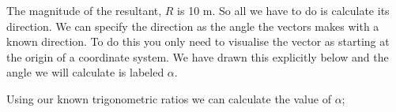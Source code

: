 {\begin{mdframed}[linewidth=4, leftmargin=40, rightmargin=40]
\begin{exercise}
\begin{enumerate}[noitemsep, label=\textbf{Step} \textbf{\arabic*}. ]
        \par 
        \label{m38819*id195854}The magnitude of the resultant, \begin{math}R\end{math} is 10 m. So all we have to do is calculate its direction. We can specify the direction as the angle the vectors makes with a known direction. To do this you only need to visualise the vector as starting at the origin of a coordinate system. We have drawn this explicitly below and the angle we will calculate is labeled \begin{math}\alpha \end{math}.\par 
        \label{m38819*id195877}Using our known trigonometric ratios we can calculate the value of \begin{math}\alpha \end{math};\par 
        \label{m38819*id195891}\nopagebreak\noindent{}
\end{enumerate}
\end{exercise}
\end{mdframed}}
